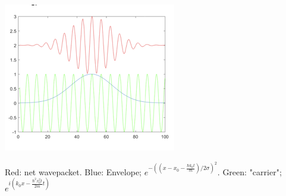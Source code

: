 \documentclass{article}
\begin{document}
\includegraphics[width = 0.6 \textwidth]{Lecture09/image.png}

Red: net wavepacket. Blue: Envelope; $e^{- \left( (x - x_0 - \frac{\hbar k_0 t}{m})/2 \sigma \right)^2}$. Green: "carrier"; $e^{i \left( k_0 x - \frac{\hbar^2 x_0^2 t}{2m} t \right)}$
\end{document}
